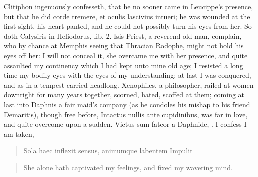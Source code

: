 Clitiphon ingenuously confesseth, that he no sooner came in
Leucippe's presence, but that he did corde tremere, et oculis lascivius
intueri; he was wounded at the first sight, his heart panted, and
he could not possibly turn his eyes from her. So doth Calysiris in
Heliodorus, lib. 2. Isis Priest, a reverend old man, complain, who by
chance at Memphis seeing that Thracian Rodophe, might not hold his eyes
off her: I will not conceal it, she overcame me with her
presence, and quite assaulted my continency which I had kept unto mine
old age; I resisted a long time my bodily eyes with the eyes of my
understanding; at last I was conquered, and as in a tempest carried
headlong.  Xenophiles, a philosopher, railed at women downright
for many years together, scorned, hated, scoffed at them; coming at
last into Daphnis a fair maid's company (as he condoles his mishap to
his friend Demaritis), though free before, Intactus nullis ante
cupidinibus, was far in love, and quite overcome upon a sudden. Victus
sum fateor a Daphnide, \etc{}. I confess I am taken,

\begin{latin}
\begin{verse}%
Sola haec inflexit sensus, animumque labentem
Impulit
\end{verse}%
\end{latin}
\translationrule%
\begin{verse}%
She alone hath captivated my feelings,
and fixed my wavering mind.
\end{verse}%

